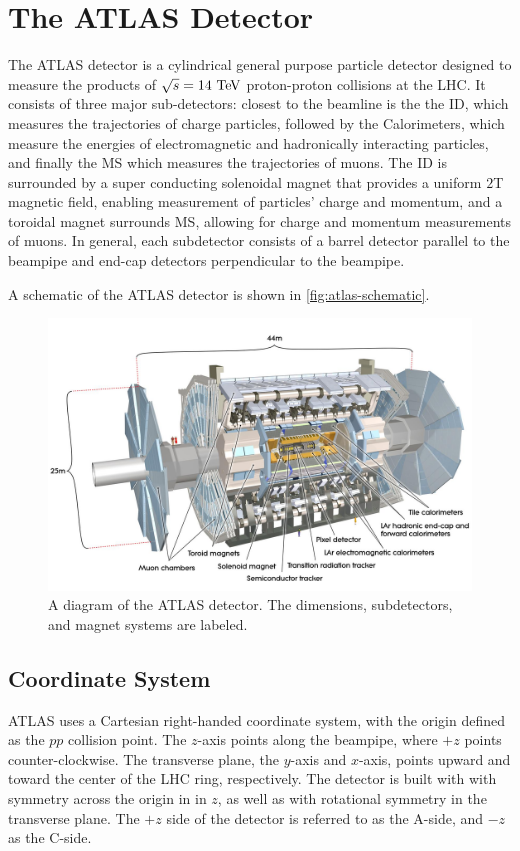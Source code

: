 \chapter{The ATLAS Detector}

The \ac{ATLAS} detector is a cylindrical general purpose particle detector designed to measure the products of $\sqrt{s} = 14 \TeV$ proton-proton collisions at the \ac{LHC}. It consists of three major sub-detectors: closest to the beamline is the the \ac{ID}, which measures the trajectories of charge particles, followed by the Calorimeters, which measure the energies of electromagnetic and hadronically interacting particles, and finally the \ac{MS} which measures the trajectories of muons. The \ac{ID} is surrounded by a super conducting solenoidal magnet that provides a uniform $2$T magnetic field, enabling measurement of particles' charge and momentum, and a toroidal magnet surrounds \ac{MS}, allowing for charge and momentum measurements of muons. In general, each subdetector consists of a barrel detector parallel to the beampipe and end-cap detectors perpendicular to the beampipe. \cite{atlas-overview}

A schematic of the \ac{ATLAS} detector is shown in \autoref{fig:atlas-schematic}.


\begin{figure}[htbp]
\centering
\includegraphics[width=.8\textwidth]{figures/Detector/atlas-schematic.jpg}
\caption{A diagram of the \ac{ATLAS} detector. The dimensions, subdetectors, and magnet systems are labeled. }
\label{fig:atlas-schematic}
\end{figure}

\section{Coordinate System}
\ac{ATLAS} uses a Cartesian right-handed coordinate system, with the origin defined as the $pp$ collision point. The $z$-axis points along the beampipe, where $+z$ points counter-clockwise. The transverse plane, the $y$-axis and $x$-axis, points upward and toward the center of the \ac{LHC} ring, respectively. The detector is built with with symmetry across the origin in in $z$, as well as with rotational symmetry in the transverse plane. The $+z$ side of the detector is referred to as the A-side, and $-z$ as the C-side.

